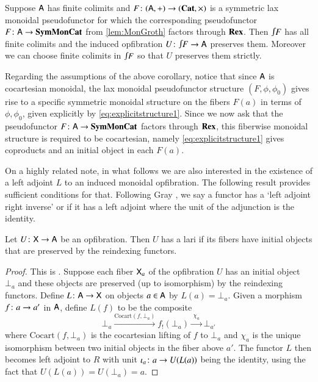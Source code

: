 \documentclass[reqno]{amsart}
\begin{document}
\begin{cor} \label{cor:fcocMonGroth}
 Suppose $\mathsf{A}$ has finite colimits and $F \colon (\mathsf{A},+) \to (\mathbf{Cat},\times)$ is a symmetric lax monoidal pseudofunctor for which the corresponding pseudofunctor $F  \colon \mathsf{A} \to \mathbf{SymMonCat}$ from \cref{lem:MonGroth} factors through $\mathbf{Rex}$.  Then $\inta F$ has all finite colimits and  the induced opfibration $U\maps \inta F \to \A$ preserves them.  Moreover we can choose finite colimits in $\inta F$ so that $U$ preserves them strictly.
\end{cor}

Regarding the assumptions of the above corollary, notice that since $\mathsf{A}$ is cocartesian monoidal, the lax monoidal pseudofunc\-tor structure $(F,\phi,\phi_0)$ gives rise to a specific symmetric monoidal structure on the fibers $F(a)$ in terms of $\phi,\phi_0$, given explicitly by \cref{eq:explicitstructure1}. Since we now ask that the pseudofunctor $F\colon \mathsf{A}\to\mathbf{SymMonCat}$ factors through $\mathbf{Rex}$, this fiberwise monoidal structure is required to be cocartesian, namely \cref{eq:explicitstructure1} gives coproducts and an initial object in each $F(a)$.

On a highly related note, in what follows we are also interested in the existence of a left adjoint $L$ to an induced monoidal opfibration.  The following result provides sufficient conditions for that.  Following Gray \cite{Gray}, we say a functor has a `left adjoint right inverse' or  if it has a left adjoint where the unit of the adjunction is the identity.

\begin{lem} \label{prop:opfibtolari}
Let $U \colon\mathsf{X} \to \mathsf{A}$ be an opfibration.   Then $U$ has a lari if its fibers have initial objects
that are preserved by the reindexing functors.
\end{lem}

\begin{proof}
 This is \cite[Proposition~4.4]{Gray}.    Suppose each fiber $\mathsf{X}_a$ of the opfibration $U$ has an initial object $\bot_a$ and these objects are preserved (up to isomorphism) by the reindexing functors.   Define $L \colon \mathsf{A} \to \mathsf{X}$ on objects $a \in \mathsf{A}$ by $L(a) = \bot_a$.   Given a morphism $f\colon a\to a'$ in $\mathsf{A}$, define $L(f)$ to be the composite
 \begin{equation}\label{eq:Lonarrows}
  \bot_a\xrightarrow{\mathrm{Cocart}(f,\bot_a)}f_!(\bot_a)\xrightarrow{\;\chi_a\;}\bot_{a'}
 \end{equation}
where $\mathrm{Cocart}(f,\bot_a)$ is the cocartesian lifting of $f$ to $\bot_a$ and $\chi_a$ is the unique isomorphism between two initial objects in the fiber above $a'$.    The functor $L$ then becomes left adjoint to $R$ with unit $\iota_a \colon a \to U(L(a))$ being the identity, using the fact that $U(L(a)) = U(\bot_a) = a$.
\end{proof}
\end{document}
